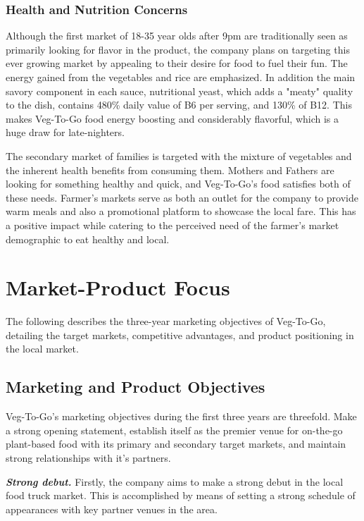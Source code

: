\documentclass[12pt, letterpaper]{article}
\newcommand{\companyname}{Veg-To-Go}
\begin{document}
\subsubsection{Health and Nutrition Concerns}
Although the first market of 18-35 year olds after 9pm are traditionally seen as primarily looking for flavor in the product, the company plans on targeting this ever growing market by appealing to their desire for food to fuel their fun.  The energy gained from the vegetables and rice are emphasized.  In addition the main savory component in each sauce, nutritional yeast, which adds a "meaty" quality to the dish, contains 480\% daily value of B6 per serving, and 130\% of B12. \cite{yeast} This makes \companyname{} food energy boosting and considerably flavorful, which is a huge draw for late-nighters.

The secondary market of families is targeted with the mixture of vegetables and the inherent health benefits from consuming them.  Mothers and Fathers are looking for something healthy and quick, and \companyname{}'s food satisfies both of these needs. Farmer's markets serve as both an outlet for the company to provide warm meals and also a promotional platform to showcase the local fare. This has a positive impact while catering to the perceived need of the farmer's market demographic to eat healthy and local.

\newpage

\section{Market-Product Focus}
The following describes the three-year marketing objectives of \companyname{}, detailing the target markets, competitive advantages, and product positioning in the local market.
\subsection{Marketing and Product Objectives}
\companyname's{} marketing objectives during the first three years are threefold.  Make a strong opening statement, establish itself as the premier venue for on-the-go plant-based food with its primary and secondary target markets, and maintain strong relationships with it's partners.

\textbf{\emph{Strong debut.}} Firstly, the company aims to make a strong debut in the local food truck market.  This is accomplished by means of setting a strong schedule of appearances with key partner venues in the area.
\end{document}
